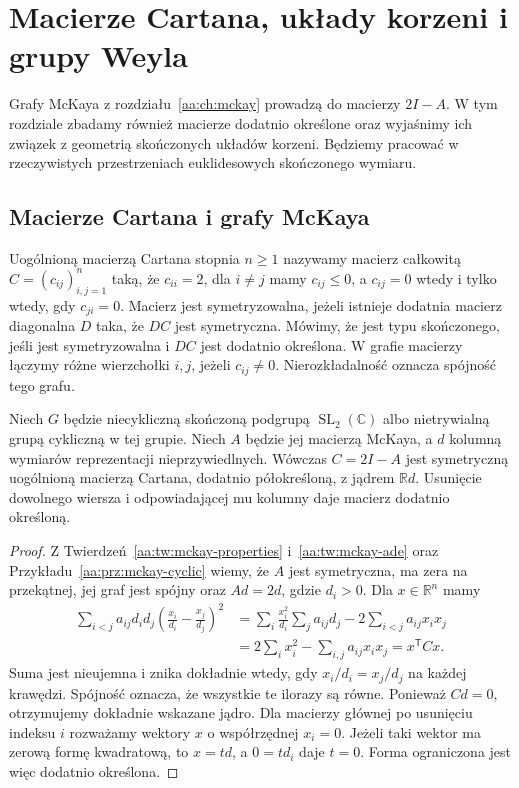 \chapter{Macierze Cartana, układy korzeni i grupy Weyla}
\label{aa:ch:root-systems}

Grafy McKaya z rozdziału~\ref{aa:ch:mckay} prowadzą do
macierzy $2I-A$. W tym rozdziale zbadamy również macierze
dodatnio określone oraz wyjaśnimy ich związek z geometrią
skończonych układów korzeni. Będziemy pracować w rzeczywistych
przestrzeniach euklidesowych skończonego wymiaru.

\section{Macierze Cartana i grafy McKaya}

\begin{definicja}
\label{aa:def:generalized-cartan}
Uogólnioną macierzą Cartana stopnia $n\ge1$ nazywamy
macierz całkowitą $C=(c_{ij})_{i,j=1}^n$ taką, że
$c_{ii}=2$, dla $i\ne j$ mamy $c_{ij}\le0$, a
$c_{ij}=0$ wtedy i tylko wtedy, gdy $c_{ji}=0$.
Macierz jest symetryzowalna, jeżeli istnieje dodatnia
macierz diagonalna $D$ taka, że $DC$ jest symetryczna.
Mówimy, że jest typu skończonego, jeśli jest
symetryzowalna i $DC$ jest dodatnio określona.
W grafie macierzy łączymy różne wierzchołki $i,j$,
jeżeli $c_{ij}\ne0$. Nierozkładalność oznacza
spójność tego grafu.
\end{definicja}

\begin{stwierdzenie}
\label{aa:prop:mckay-cartan}
Niech $G$ będzie niecykliczną skończoną podgrupą
$\operatorname{SL}_2(\mathbb C)$ albo nietrywialną grupą
cykliczną w tej grupie. Niech $A$ będzie jej macierzą
McKaya, a $d$ kolumną wymiarów reprezentacji
nieprzywiedlnych. Wówczas $C=2I-A$ jest symetryczną
uogólnioną macierzą Cartana, dodatnio półokreśloną,
z jądrem $\mathbb R d$. Usunięcie dowolnego wiersza
i odpowiadającej mu kolumny daje macierz dodatnio określoną.
\end{stwierdzenie}
\begin{proof}
Z Twierdzeń~\ref{aa:tw:mckay-properties}
i~\ref{aa:tw:mckay-ade} oraz
Przykładu~\ref{aa:prz:mckay-cyclic} wiemy, że $A$
jest symetryczna, ma zera na przekątnej, jej graf jest
spójny oraz $Ad=2d$, gdzie $d_i>0$.
Dla $x\in\mathbb R^n$ mamy
\[
\begin{aligned}
 \sum_{i<j}a_{ij}d_id_j
  \left(\frac{x_i}{d_i}-\frac{x_j}{d_j}\right)^2
 &=\sum_i \frac{x_i^2}{d_i}\sum_j a_{ij}d_j
       -2\sum_{i<j}a_{ij}x_ix_j\\
 &=2\sum_i x_i^2-\sum_{i,j}a_{ij}x_ix_j
 =x^{\mathsf T}Cx.
\end{aligned}
\]
Suma jest nieujemna i znika dokładnie wtedy, gdy
$x_i/d_i=x_j/d_j$ na każdej krawędzi. Spójność
oznacza, że wszystkie te ilorazy są równe. Ponieważ
$Cd=0$, otrzymujemy dokładnie wskazane jądro.
Dla macierzy głównej po usunięciu indeksu $i$ rozważamy
wektory $x$ o współrzędnej $x_i=0$. Jeżeli taki
wektor ma zerową formę kwadratową, to $x=td$,
a $0=td_i$ daje $t=0$. Forma ograniczona jest więc
dodatnio określona.
\end{proof}

